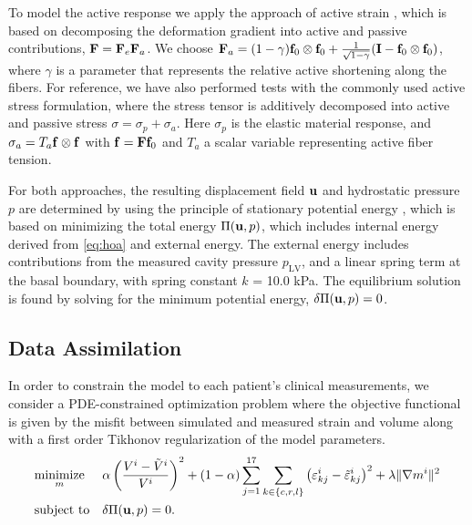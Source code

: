 To model the active response we apply the approach of active strain
\cite{ambrosi2012active}, which is based on decomposing
the deformation gradient into active and passive contributions, $\mathbf{F} =
\mathbf{F}_e \mathbf{F}_a$. We choose $\mathbf{F}_a = (1 - \gamma) \mathbf{f}_0 \otimes \mathbf{f}_0 +
\frac{1}{\sqrt{1 - \gamma}} (\mathbf{I} - \mathbf{f}_0 \otimes \mathbf{f}_0)$, where $\gamma$
is a parameter that represents the relative active shortening along
the fibers. For reference, we have also performed tests with the
commonly used active stress formulation, where the stress tensor 
is additively decomposed into active and passive stress $\sigma =
\sigma_p + \sigma_a$. Here $\sigma_p$ is
the elastic material response, and $\sigma_a = T_a \mathbf{f} \otimes \mathbf{f}$ with
$\mathbf{f} = \mathbf{F}\mathbf{f}_0$ and $T_a$ a scalar variable representing active fiber
tension.


For both approaches, the resulting displacement field $\mathbf{u}$ and hydrostatic pressure $p$
are determined by using the principle of stationary potential energy
\cite{holzapfel2000nonlinear}, which is based on minimizing the total
energy  $\Pi(\mathbf{u}, p)$, which includes internal energy derived from
\eqref{eq:hoa} and external energy. The external energy includes
contributions from the measured cavity pressure $p_{\text{LV}}$, and a
linear spring term at the basal boundary, with spring constant
$k$ = 10.0 kPa. The equilibrium solution is found by solving for the minimum
potential energy, $\delta\Pi(\mathbf{u}, p) = 0$. 

\subsection{Data Assimilation}
In order to constrain the model to each patient's clinical measurements, we
consider a PDE-constrained optimization problem where
the objective functional is given by the misfit between
simulated and measured strain and volume along with a first order Tikhonov regularization of the
model parameters.
\begin{equation}
  \begin{aligned}
    \label{eq:pde_opt}
    & \underset{m}{\text{minimize}}
    & &  \alpha \left( \frac{V^i - \tilde{V}^i}{V^i} \right)^2
    + (1-\alpha)  \sum_{j= 1}^{17} \sum_{k \in \{c,r,l\}}  \left( \varepsilon_{kj}^i
      -  \tilde{\varepsilon}_{kj}^i \right)^2
    + \lambda \| \nabla m^i \|^2 \\
    & \text{subject to}
    & & \delta \Pi(\mathbf{u}, p) = 0.
  \end{aligned}
\end{equation}


